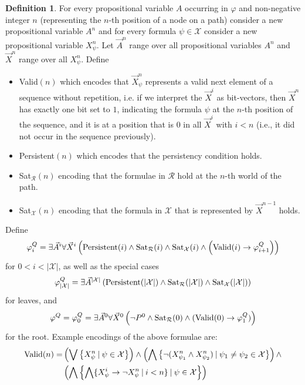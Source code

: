\documentclass{easychair}
\theoremstyle{definition}
\theoremstyle{definition}
\theoremstyle{definition}
\theoremstyle{definition}
\theoremstyle{definition}
\newtheorem{definition}[theorem]{Definition}
\theoremstyle{definition}
\theoremstyle{definition}
\begin{document}
\begin{definition}
For every propositional variable $A$ occurring in $\varphi$ and non-negative integer $n$ (representing the $n$-th position of a node on a path) consider a new propositional variable $A^n$ and for every formula $\psi\in\mathcal X$ consider a new propositional variable $X_\psi^n$.
Let $\vec A^n$ range over all propositional variables $A^n$ and $\vec X^n$ range over all $X_\psi^n$.
Define
	\begin{itemize}
		\item {\normalfont Valid}$(n)$ which encodes that $\vec X^n_\psi$ represents a valid next element of a sequence without repetition, i.e. if we interpret the $\vec X^i$ as bit-vectors, then $\vec X^n$ has exactly one bit set to $1$, indicating the formula $\psi$ at the $n$-th position of the sequence, and it is at a position that is $0$ in all $\vec X^i$ with $i < n$ (i.e., it did not occur in the sequence previously).
		\item {\normalfont Persistent}$(n)$ which encodes that the persistency condition holds.
		\item {\normalfont Sat}$_{\mathcal R}(n)$ encoding that the formulae in $\mathcal R$ hold at the $n$-th world of the path.
		\item {\normalfont Sat}$_{\mathcal X}(n)$ encoding that the formula in $\mathcal X$ that is represented by $\vec X^{n-1}$ holds.
	\end{itemize}
	Define$$\varphi^Q_{i} = \exists \vec A^i\forall \vec X^i\left(\text{\normalfont Persistent}(i)\wedge \text{\normalfont Sat}_{\mathcal R}(i)\wedge \text{\normalfont Sat}_{\mathcal X}(i)\wedge\left(\text{\normalfont Valid}(i)\to \varphi^Q_{i+1}\right)\right)$$
	for $0 < i < |\mathcal{X}|$, as well as the special cases
	$$\varphi^Q_{|\mathcal{X}|} = \exists \vec A^{|\mathcal{X}|}\left(\text{\normalfont Persistent}(|\mathcal{X}|)\wedge \text{\normalfont Sat}_{\mathcal R}(|\mathcal{X}|)\wedge \text{\normalfont Sat}_{\mathcal X}(|\mathcal{X}|)\right)$$
	for leaves, and $$\varphi^Q = \varphi_0^Q = \exists \vec A^0\forall \vec X^0\left(\neg P^0\wedge \text{\normalfont Sat}_{\mathcal R}(0)\wedge(\text{\normalfont Valid}(0)\to \varphi_1^Q)\right)$$for the root.
	Example encodings of the above formulae are:
	\begin{align*}
		\text{\normalfont Valid}(n) = &\left(\bigvee\left\{X^n_\psi\:|\:\psi\in\mathcal X\right\}\right)\wedge\left(\bigwedge \left\{\neg(X^n_{\psi_1}\wedge X^n_{\psi_2})\:|\:\psi_1\neq\psi_2\in\mathcal X\right\}\right)\wedge\\&\left(\bigwedge\left\{\bigwedge\{X^i_\psi\to\neg X^n_\psi\:|\:i < n\}\:|\:\psi\in\mathcal X\right\}\right)\\

\end{align*}
\end{definition}
\end{document}
